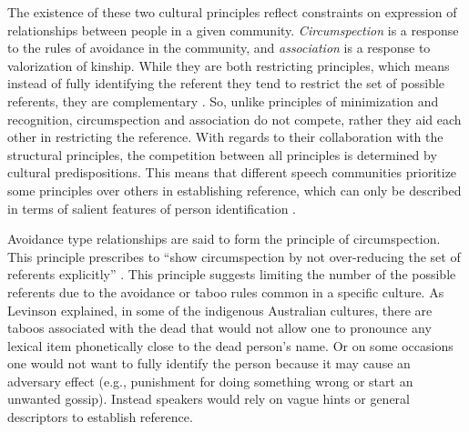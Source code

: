 \documentclass[12pt, draft]{article}
\begin{document}
The existence of these two cultural principles reflect constraints on expression of relationships between people in a given community. \textit{Circumspection} is a response to the rules of avoidance in the community, and \textit{association} is a response to valorization of kinship. While they are both restricting principles, which means instead of fully identifying the referent they tend to restrict the set of possible referents, they are complementary \parencite{blythe2009}. So, unlike principles of minimization and recognition, circumspection and association do not compete, rather they aid each other in restricting the reference. With regards to their collaboration with the structural principles, the competition between all principles is determined by cultural predispositions. This means that different speech communities prioritize some principles over others in establishing reference, which can only be described in terms of salient features of person identification \parencite{enfield2013a}. 

Avoidance type relationships are said to form the principle of circumspection. This principle prescribes to ``show circumspection by not over-reducing the set of referents explicitly'' \parencite[p. 31]{levinson2007}. This principle suggests limiting the number of the possible referents due to the avoidance or taboo rules common in a specific culture. As Levinson explained, in some of the indigenous Australian cultures, there are taboos associated with the dead that would not allow one to pronounce any lexical item phonetically close to the dead person's name. Or on some occasions one would not want to fully identify the person because it may cause an adversary effect (e.g., punishment for doing something wrong or start an unwanted gossip). Instead speakers would rely on vague hints or general descriptors to establish reference. 
\end{document}
